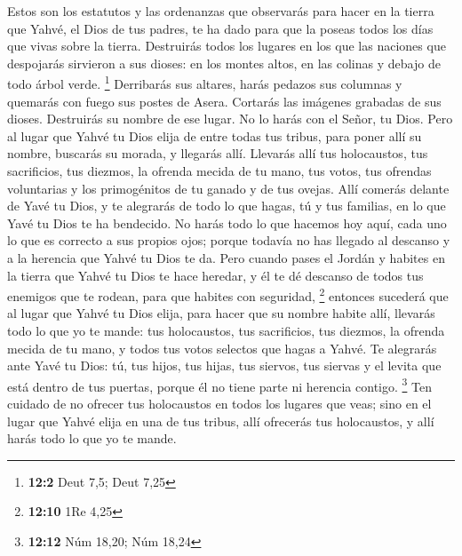  Estos son los estatutos y las ordenanzas que observarás
para hacer en la tierra que Yahvé, el Dios de tus padres, te ha dado
para que la poseas todos los días que vivas sobre la tierra.
 Destruirás todos los lugares en los que las naciones que
despojarás sirvieron a sus dioses: en los montes altos, en las colinas y
debajo de todo árbol verde. \footnote{\textbf{12:2} Deut 7,5; Deut 7,25}
 Derribarás sus altares, harás pedazos sus columnas y
quemarás con fuego sus postes de Asera. Cortarás las imágenes grabadas
de sus dioses. Destruirás su nombre de ese lugar.  No lo
harás con el Señor, tu Dios.  Pero al lugar que Yahvé tu
Dios elija de entre todas tus tribus, para poner allí su nombre,
buscarás su morada, y llegarás allí.  Llevarás allí tus
holocaustos, tus sacrificios, tus diezmos, la ofrenda mecida de tu mano,
tus votos, tus ofrendas voluntarias y los primogénitos de tu ganado y de
tus ovejas.  Allí comerás delante de Yavé tu Dios, y te
alegrarás de todo lo que hagas, tú y tus familias, en lo que Yavé tu
Dios te ha bendecido.  No harás todo lo que hacemos hoy
aquí, cada uno lo que es correcto a sus propios ojos; 
porque todavía no has llegado al descanso y a la herencia que Yahvé tu
Dios te da.  Pero cuando pases el Jordán y habites en la
tierra que Yahvé tu Dios te hace heredar, y él te dé descanso de todos
tus enemigos que te rodean, para que habites con seguridad, \footnote{\textbf{12:10}
  1Re 4,25}  entonces sucederá que al lugar que Yahvé tu
Dios elija, para hacer que su nombre habite allí, llevarás todo lo que
yo te mande: tus holocaustos, tus sacrificios, tus diezmos, la ofrenda
mecida de tu mano, y todos tus votos selectos que hagas a Yahvé.
 Te alegrarás ante Yavé tu Dios: tú, tus hijos, tus
hijas, tus siervos, tus siervas y el levita que está dentro de tus
puertas, porque él no tiene parte ni herencia contigo. \footnote{\textbf{12:12}
  Núm 18,20; Núm 18,24}  Ten cuidado de no ofrecer tus
holocaustos en todos los lugares que veas;  sino en el
lugar que Yahvé elija en una de tus tribus, allí ofrecerás tus
holocaustos, y allí harás todo lo que yo te mande.

